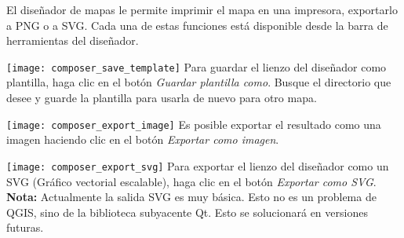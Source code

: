 El diseñador de mapas le permite imprimir el mapa en una impresora, exportarlo a PNG o a SVG. Cada una de estas funciones está disponible desde la barra de herramientas del diseñador.

\texttt{[image: composer\_save\_template]} Para guardar el lienzo del diseñador como plantilla, haga clic en el botón \textit{Guardar plantilla como}. Busque el directorio que desee y guarde la plantilla para usarla de nuevo para otro mapa.

\texttt{[image: composer\_export\_image]} Es posible exportar el resultado como una imagen haciendo clic en el botón \textit{Exportar como imagen}. 

\texttt{[image: composer\_export\_svg]} Para exportar el lienzo del diseñador como un SVG (Gráfico vectorial escalable), haga clic en el botón \textit{Exportar como SVG}. 
\textbf{Nota:} Actualmente la salida SVG es muy básica. Esto no es un problema de QGIS, sino de la biblioteca subyacente Qt. Esto se solucionará en versiones futuras.
 